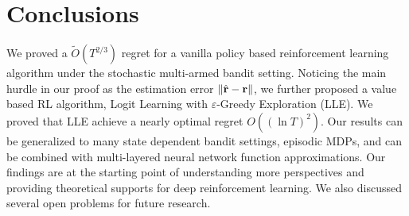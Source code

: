 \section{Conclusions}
\label{sec:conclusions}
We proved a $\tilde{O}(T^{2/3})$ regret for a vanilla policy based reinforcement learning algorithm under the stochastic multi-armed bandit setting. 
Noticing the main hurdle in our proof as the estimation error $\|\hat{{\mathbf{r}}} - {\mathbf{r}}\|$, we further proposed a value based RL algorithm, Logit Learning with $\varepsilon$-Greedy Exploration (LLE). 
We proved that LLE achieve a nearly optimal regret $O((\ln T)^2)$.
Our results can be generalized to many state dependent bandit settings, episodic MDPs, and can be combined with multi-layered neural network function approximations. Our findings are at the starting point of understanding more perspectives and providing theoretical supports for deep reinforcement learning. We also discussed several open problems for future research.
